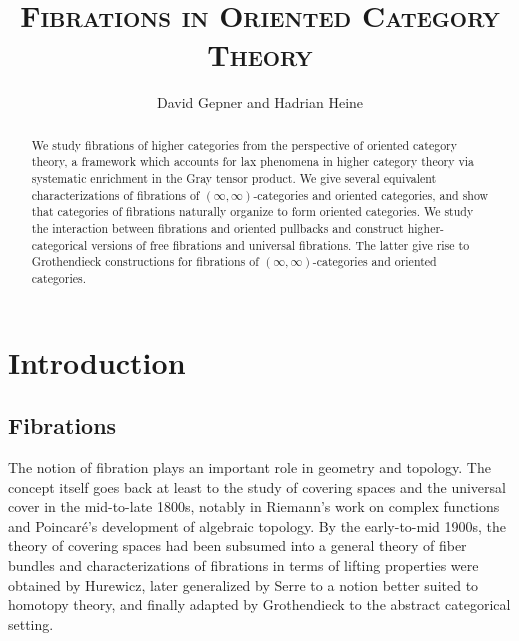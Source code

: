\documentclass[10pt,oneside]{article}
\numberwithin{equation}{section} %
\numberwithin{figure}{section} %
\theoremstyle{plain}
\theoremstyle{definition}
\begin{document}
\title{\textsc{Fibrations in Oriented Category Theory}}


\author{David Gepner and Hadrian Heine}

\maketitle

\begin{abstract}
We study fibrations of higher categories from the perspective of oriented category theory, a framework which accounts for lax phenomena in higher category theory via systematic enrichment in the Gray tensor product.
We give several equivalent characterizations of fibrations
of $(\infty,\infty)$-categories and oriented categories,
and show that categories of fibrations naturally
organize to form oriented categories.
We study the interaction between fibrations and oriented pullbacks
and construct higher-categorical versions of free fibrations and universal fibrations.
The latter give rise to Grothendieck constructions for fibrations of $(\infty,\infty)$-categories and oriented categories.
\end{abstract}

\tableofcontents

\vspace{5mm}

\section{Introduction}

\subsection{Fibrations}
The notion of fibration plays an important role in geometry and topology.
The concept itself goes back at least to the study of covering spaces and the universal cover in the mid-to-late 1800s, notably in Riemann's work on complex functions and Poincar\'e's development of algebraic topology.
By the early-to-mid 1900s, the theory of covering spaces had been subsumed into a general theory of fiber bundles
and characterizations of fibrations in terms of lifting properties were obtained by Hurewicz, later generalized by Serre to a notion better suited to homotopy theory, and finally adapted by Grothendieck to the abstract categorical setting.
\end{document}
